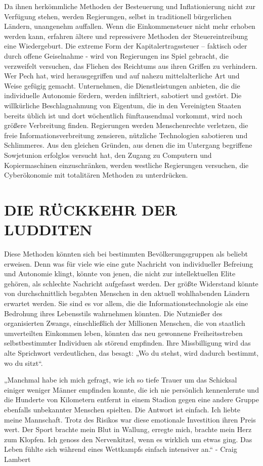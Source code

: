 \documentclass[
  a5paper,
  smalldemyvopaper,10pt,twoside,onecolumn,openright,extrafontsizes,hidelinks]{memoir}
\renewenvironment{quote}%
               {\list{}{\rightmargin=.6cm\leftmargin=.6cm}%
                \itshape \item[]}%
               {\endlist}
\begin{document}
Da ihnen herkömmliche Methoden der Besteuerung und Inflationierung nicht
zur Verfügung stehen, werden Regierungen, selbst in traditionell
bürgerlichen Ländern, unangenehm auffallen. Wenn die Einkommensteuer
nicht mehr erhoben werden kann, erfahren ältere und repressivere
Methoden der Steuereintreibung eine Wiedergeburt. Die extreme Form der
Kapitalertragssteuer -- faktisch oder durch offene Geiselnahme - wird
von Regierungen ins Spiel gebracht, die verzweifelt versuchen, das
Fliehen des Reichtums aus ihren Griffen zu verhindern. Wer Pech hat,
wird herausgegriffen und auf nahezu mittelalterliche Art und Weise
gefügig gemacht. Unternehmen, die Dienstleistungen anbieten, die die
individuelle Autonomie fördern, werden infiltriert, sabotiert und
gestört. Die willkürliche Beschlagnahmung von Eigentum, die in den
Vereinigten Staaten bereits üblich ist und dort wöchentlich
fünftausendmal vorkommt, wird noch größere Verbreitung finden.
Regierungen werden Menschenrechte verletzen, die freie
Informationsverbreitung zensieren, nützliche Technologien sabotieren und
Schlimmeres. Aus den gleichen Gründen, aus denen die im Untergang
begriffene Sowjetunion erfolglos versucht hat, den Zugang zu Computern
und Kopiermaschinen einzuschränken, werden westliche Regierungen
versuchen, die Cyberökonomie mit totalitären Methoden zu unterdrücken.

\section{DIE RÜCKKEHR DER LUDDITEN}\label{die-ruxfcckkehr-der-ludditen}

Diese Methoden könnten sich bei bestimmten Bevölkerungsgruppen als
beliebt erweisen. Denn was für viele wie eine gute Nachricht von
individueller Befreiung und Autonomie klingt, könnte von jenen, die
nicht zur intellektuellen Elite gehören, als schlechte Nachricht
aufgefasst werden. Der größte Widerstand könnte von durchschnittlich
begabten Menschen in den aktuell wohlhabenden Ländern erwartet werden.
Sie sind es vor allem, die die Informationstechnologie als eine
Bedrohung ihres Lebensstils wahrnehmen könnten. Die Nutznießer des
organisierten Zwangs, einschließlich der Millionen Menschen, die von
staatlich umverteilten Einkommen leben, könnten das neu gewonnene
Freiheitsstreben selbstbestimmter Individuen als störend empfinden. Ihre
Missbilligung wird das alte Sprichwort verdeutlichen, das besagt: „Wo du
stehst, wird dadurch bestimmt, wo du sitzt``.

\begin{quote}
„Manchmal habe ich mich gefragt, wie ich so tiefe Trauer um das
Schicksal einiger weniger Männer empfinden konnte, die ich nie
persönlich kennenlernte und die Hunderte von Kilometern entfernt in
einem Stadion gegen eine andere Gruppe ebenfalls unbekannter Menschen
spielten. Die Antwort ist einfach. Ich liebte meine Mannschaft. Trotz
des Risikos war diese emotionale Investition ihren Preis wert. Der Sport
brachte mein Blut in Wallung, erregte mich, brachte mein Herz zum
Klopfen. Ich genoss den Nervenkitzel, wenn es wirklich um etwas ging.
Das Leben fühlte sich während eines Wettkampfs einfach intensiver an.``
- Craig Lambert
\end{quote}
\end{document}
